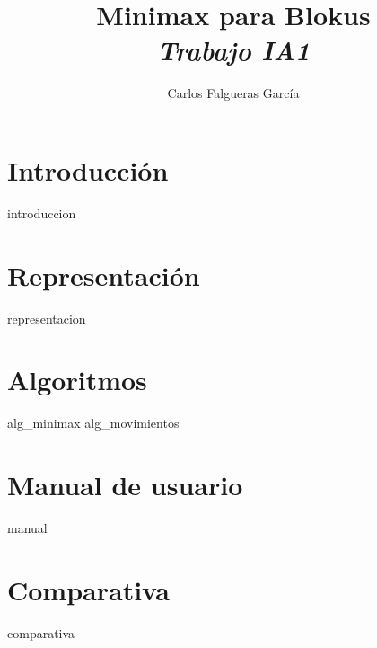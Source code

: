 \documentclass[pdftex,a4paper,12pt]{article}
\title{{\Huge Minimax para Blokus} \\ {\large\slshape Trabajo IA1}}
\author{Carlos Falgueras García}
\date{}
\begin{document}
\maketitle
\tableofcontents
\setlength{\parskip}{1em}
\thispagestyle{empty} %
\clearpage

\section{Introducción}
{introduccion}

\section{Representación}
{representacion}

\section{Algoritmos}
{alg_minimax}
\clearpage
{alg_movimientos}
\clearpage

\section{Manual de usuario}
{manual}
\clearpage

\section{Comparativa}
{comparativa}
\end{document}
